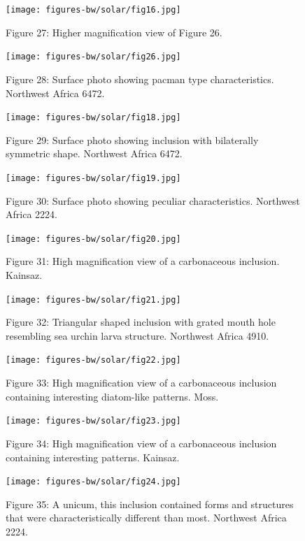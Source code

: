 \documentclass[a4paper, 12pt, oneside]{article}
\begin{document}
\begin{figure}[b]
\centering
\texttt{[image: figures-bw/solar/fig16.jpg]}
\caption{Figure 27: Higher magnification view of Figure 26.}
\end{figure}
\clearpage

\begin{figure}[b]
\texttt{[image: figures-bw/solar/fig26.jpg]}
\caption{Figure 28: Surface photo showing pacman type characteristics. Northwest Africa 6472.}
\centering
\end{figure}
\clearpage

\begin{figure}[b]
\centering
\texttt{[image: figures-bw/solar/fig18.jpg]}
\caption{Figure 29: Surface photo showing inclusion with bilaterally symmetric shape. Northwest Africa 6472.}
\end{figure}
\clearpage

\begin{figure}[b]
\centering
\texttt{[image: figures-bw/solar/fig19.jpg]}
\caption{Figure 30: Surface photo showing peculiar characteristics. Northwest Africa 2224.}
\end{figure}
\clearpage

\begin{figure}[b]
\centering
\texttt{[image: figures-bw/solar/fig20.jpg]}
\caption{Figure 31: High magnification view of a carbonaceous inclusion. Kainsaz.}
\end{figure}
\clearpage

\begin{figure}[b]
\centering
\texttt{[image: figures-bw/solar/fig21.jpg]}
\caption{Figure 32: Triangular shaped inclusion with grated mouth hole resembling sea urchin larva structure. Northwest Africa 4910.}
\end{figure}
\clearpage

\begin{figure}[b]
\centering
\texttt{[image: figures-bw/solar/fig22.jpg]}
\caption{Figure 33: High magnification view of a carbonaceous inclusion containing interesting diatom-like patterns. Moss.}
\end{figure}
\clearpage

\begin{figure}[b]
\centering
\texttt{[image: figures-bw/solar/fig23.jpg]}
\caption{Figure 34: High magnification view of a carbonaceous inclusion containing interesting patterns. Kainsaz.}
\end{figure}
\clearpage

\begin{figure}[b]
\centering
\texttt{[image: figures-bw/solar/fig24.jpg]}
\caption{Figure 35: A unicum, this inclusion contained forms and structures that were characteristically different than most. Northwest Africa 2224.}
\end{figure}
\clearpage
\pagestyle{plain}
\printindex
\clearpage
\end{document}

